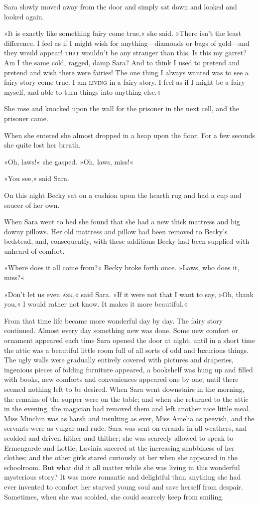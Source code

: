 Sara slowly moved away from the door and simply sat down and looked and looked again.

»It is exactly like something fairy come true,« she said. »There isn't the least difference. I feel as if I might wish for anything—diamonds or bags of gold—and they would appear! \textsc{that} wouldn't be any stranger than this. Is this my garret? Am I the same cold, ragged, damp Sara? And to think I used to pretend and pretend and wish there were fairies! The one thing I always wanted was to see a fairy story come true. I am \textsc{living} in a fairy story. I feel as if I might be a fairy myself, and able to turn things into anything else.«

She rose and knocked upon the wall for the prisoner in the next cell, and the prisoner came.

When she entered she almost dropped in a heap upon the floor. For a few seconds she quite lost her breath.

»Oh, laws!« she gasped. »Oh, laws, miss!«

»You see,« said Sara.

On this night Becky sat on a cushion upon the hearth rug and had a cup and saucer of her own.

When Sara went to bed she found that she had a new thick mattress and big downy pillows. Her old mattress and pillow had been removed to Becky's bedstead, and, consequently, with these additions Becky had been supplied with unheard-of comfort.

»Where does it all come from?« Becky broke forth once. »Laws, who does it, miss?«

»Don't let us even \textsc{ask},« said Sara. »If it were not that I want to say, »Oh, thank you,« I would rather not know. It makes it more beautiful.«

From that time life became more wonderful day by day. The fairy story continued. Almost every day something new was done. Some new comfort or ornament appeared each time Sara opened the door at night, until in a short time the attic was a beautiful little room full of all sorts of odd and luxurious things. The ugly walls were gradually entirely covered with pictures and draperies, ingenious pieces of folding furniture appeared, a bookshelf was hung up and filled with books, new comforts and conveniences appeared one by one, until there seemed nothing left to be desired. When Sara went downstairs in the morning, the remains of the supper were on the table; and when she returned to the attic in the evening, the magician had removed them and left another nice little meal. Miss Minchin was as harsh and insulting as ever, Miss Amelia as peevish, and the servants were as vulgar and rude. Sara was sent on errands in all weathers, and scolded and driven hither and thither; she was scarcely allowed to speak to Ermengarde and Lottie; Lavinia sneered at the increasing shabbiness of her clothes; and the other girls stared curiously at her when she appeared in the schoolroom. But what did it all matter while she was living in this wonderful mysterious story? It was more romantic and delightful than anything she had ever invented to comfort her starved young soul and save herself from despair. Sometimes, when she was scolded, she could scarcely keep from smiling.

